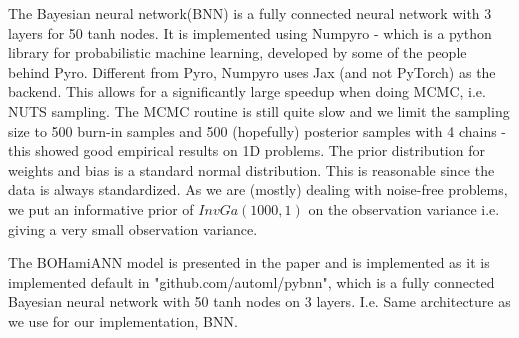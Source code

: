 The Bayesian neural network(BNN) is a fully connected neural network with 3 layers for 50 tanh
nodes. It is implemented using Numpyro - which is a python library for probabilistic machine
learning, developed by some of the people behind Pyro. Different from Pyro, Numpyro uses Jax (and
not PyTorch) as the backend. This allows for a significantly large speedup when doing MCMC, i.e.
NUTS sampling. The MCMC routine is still quite slow and we limit the sampling size to 500 burn-in
samples and 500 (hopefully) posterior samples with 4 chains - this showed good empirical results on
1D problems. The prior distribution for weights and bias is a standard normal distribution. This is
reasonable since the data is always standardized. As we are (mostly) dealing with noise-free problems, 
we put an informative prior of $InvGa(1000,1)$ on the observation variance i.e. giving a very small observation
variance. 

The BOHamiANN model is presented in the paper \cite{BOHAMIANN} and is implemented as it is implemented default
in "github.com/automl/pybnn", which is a fully connected Bayesian neural network with 50 tanh nodes on 3 layers. 
I.e. Same architecture as we use for our implementation, BNN. 

